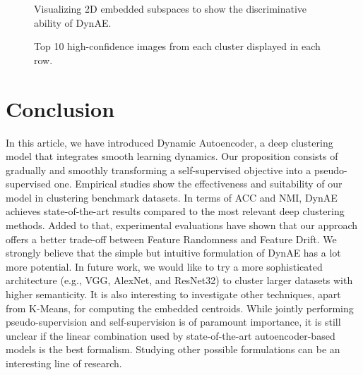 \documentclass{article}
\begin{document}
\begin{figure*}[ht]
\vskip 0.2in
\centering
    \caption{Visualizing 2D embedded subspaces to show the discriminative ability of DynAE.}
    \label{fig:Visualization of embedding subspaces}
\vskip -0.2in
\end{figure*}

\begin{figure*}[ht]
\vskip 0.2in
\centering
    \caption{Top 10 high-confidence images from each cluster displayed in each row.}
\vskip -0.2in
\label{fig:top_cluster_images}
\end{figure*}
\section{Conclusion}
In this article, we have introduced Dynamic Autoencoder, a deep clustering model that integrates smooth learning dynamics. Our proposition consists of gradually and smoothly transforming a self-supervised objective into a pseudo-supervised one. Empirical studies show the effectiveness and suitability of our model in clustering benchmark datasets. In terms of ACC and NMI, DynAE achieves state-of-the-art results compared to the most relevant deep clustering methods. Added to that, experimental evaluations have shown that our approach offers a better trade-off between Feature Randomness and Feature Drift. We strongly believe that the simple but intuitive formulation of DynAE has a lot more potential. In future work, we would like to try a more sophisticated architecture (e.g., VGG, AlexNet, and ResNet32) to cluster larger datasets with higher semanticity. It is also interesting to investigate other techniques, apart from K-Means, for computing the embedded centroids. While jointly performing pseudo-supervision and self-supervision is of paramount importance, it is still unclear if the linear combination used by state-of-the-art autoencoder-based models is the best formalism. Studying other possible formulations can be an interesting line of research.
\end{document}
